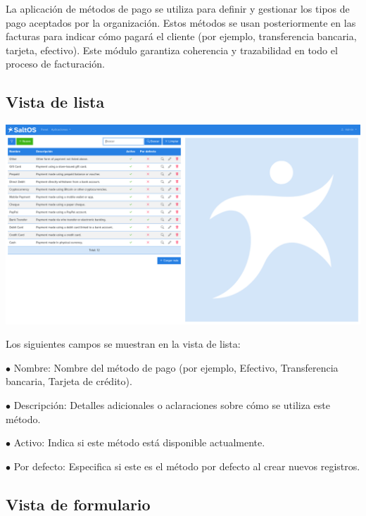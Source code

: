 \documentclass[a4paper]{article}
\begin{document}
La aplicación de métodos de pago se utiliza para definir y gestionar los tipos de pago aceptados por la organización.
Estos métodos se usan posteriormente en las facturas para indicar cómo pagará el cliente (por ejemplo, transferencia bancaria, tarjeta, efectivo).
Este módulo garantiza coherencia y trazabilidad en todo el proceso de facturación.

\hypertarget{toc148}{}
\subsection{Vista de lista}

\begin{center}\includegraphics[width=1\textwidth]{../ujest/snaps/test-screenshots-js-screenshots-sales-payment-methods-list-es-es-1-snap.png}\end{center}

Los siguientes campos se muestran en la vista de lista:

\begin{compactitem}
\item[\color{myblue}$\bullet$] Nombre: Nombre del método de pago (por ejemplo, Efectivo, Transferencia bancaria, Tarjeta de crédito).
\item[\color{myblue}$\bullet$] Descripción: Detalles adicionales o aclaraciones sobre cómo se utiliza este método.
\item[\color{myblue}$\bullet$] Activo: Indica si este método está disponible actualmente.
\item[\color{myblue}$\bullet$] Por defecto: Especifica si este es el método por defecto al crear nuevos registros.
\end{compactitem}

\hypertarget{toc149}{}
\subsection{Vista de formulario}
\end{document}
